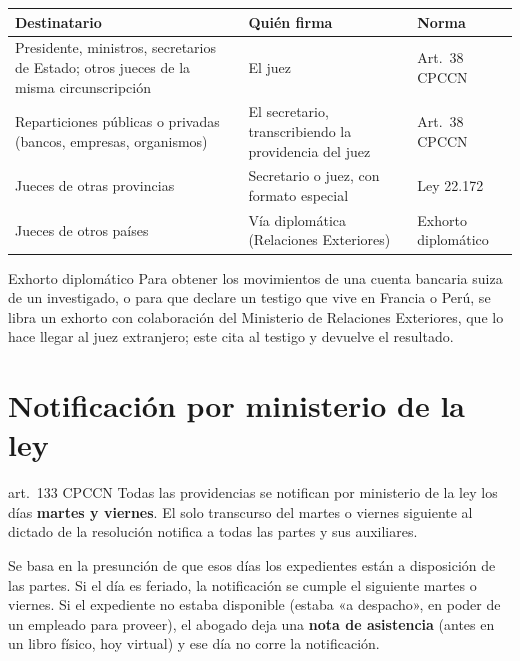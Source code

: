 \documentclass[12pt,oneside]{book}
\renewcommand{\arraystretch}{1.15}
\begin{document}
\begin{table}[H]
\centering
\renewcommand{\arraystretch}{1.25}
\begin{tabularx}{\textwidth}{>{\RaggedRight\arraybackslash}p{}>{\RaggedRight\arraybackslash}X>{\RaggedRight\arraybackslash}p{}}
\toprule
\textbf{Destinatario} & \textbf{Quién firma} & \textbf{Norma} \\
\midrule
Presidente, ministros, secretarios de Estado; otros jueces de la misma circunscripción & El juez & Art.~38 CPCCN \\
Reparticiones públicas o privadas (bancos, empresas, organismos) & El secretario, transcribiendo la providencia del juez & Art.~38 CPCCN \\
Jueces de otras provincias & Secretario o juez, con formato especial & Ley 22.172 \\
Jueces de otros países & Vía diplomática (Relaciones Exteriores) & Exhorto diplomático \\
\bottomrule
\end{tabularx}
\end{table}


\begin{example}{Exhorto diplomático}
Para obtener los movimientos de una cuenta bancaria suiza de un investigado, o para que declare un testigo que vive en Francia o Perú, se libra un exhorto con colaboración del Ministerio de Relaciones Exteriores, que lo hace llegar al juez extranjero; este cita al testigo y devuelve el resultado.
\end{example}

\section{Notificación por ministerio de la ley}

\begin{norma}{art.~133 CPCCN}
Todas las providencias se notifican por ministerio de la ley los días \textbf{martes y viernes}. El solo transcurso del martes o viernes siguiente al dictado de la resolución notifica a todas las partes y sus auxiliares.
\end{norma}

Se basa en la presunción de que esos días los expedientes están a disposición de las partes. Si el día es feriado, la notificación se cumple el siguiente martes o viernes. Si el expediente no estaba disponible (estaba «a despacho», en poder de un empleado para proveer), el abogado deja una \textbf{nota de asistencia} (antes en un libro físico, hoy virtual) y ese día no corre la notificación.
\end{document}
